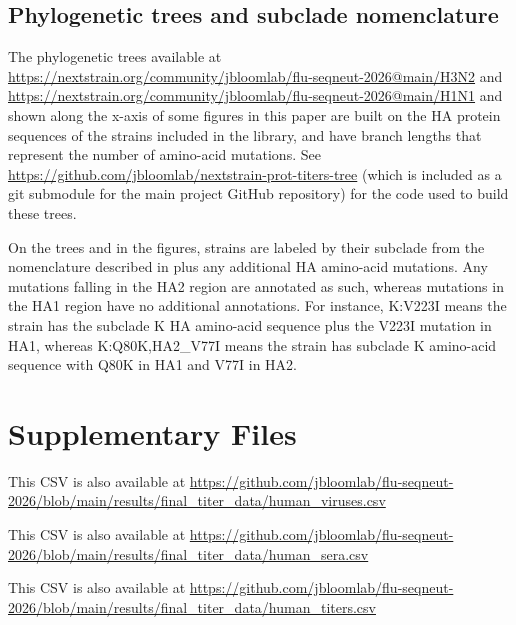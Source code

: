 \subsection{Phylogenetic trees and subclade nomenclature}

The phylogenetic trees available at \href{https://nextstrain.org/community/jbloomlab/flu-seqneut-2026@main/H3N2}{https://nextstrain.org/community/jbloomlab/flu-seqneut-2026@main/H3N2} and \href{https://nextstrain.org/community/jbloomlab/flu-seqneut-2026@main/H1N1}{https://nextstrain.org/community/jbloomlab/flu-seqneut-2026@main/H1N1} and shown along the x-axis of some figures in this paper are built on the HA protein sequences of the strains included in the library, and have branch lengths that represent the number of amino-acid mutations. See \href{https://github.com/jbloomlab/nextstrain-prot-titers-tree}{https://github.com/jbloomlab/nextstrain-prot-titers-tree} (which is included as a git submodule for the main project GitHub repository) for the code used to build these trees.

On the trees and in the figures, strains are labeled by their subclade from the nomenclature described in \citep{neher2026} plus any additional HA amino-acid mutations. Any mutations falling in the HA2 region are annotated as such, whereas mutations in the HA1 region have no additional annotations. For instance, K:V223I means the strain has the subclade K HA amino-acid sequence plus the V223I mutation in HA1, whereas K:Q80K,HA2\_V77I means the strain has subclade K amino-acid sequence with Q80K in HA1 and V77I in HA2.

\section{Supplementary Files}


This CSV is also available at \href{https://github.com/jbloomlab/flu-seqneut-2026/blob/main/results/final_titer_data/human_viruses.csv}{https://github.com/jbloomlab/flu-seqneut-2026/blob/main/results/final\_titer\_data/human\_viruses.csv}


This CSV is also available at \href{https://github.com/jbloomlab/flu-seqneut-2026/blob/main/results/final_titer_data/human_sera.csv}{https://github.com/jbloomlab/flu-seqneut-2026/blob/main/results/final\_titer\_data/human\_sera.csv}


This CSV is also available at \href{https://github.com/jbloomlab/flu-seqneut-2026/blob/main/results/final_titer_data/human_titers.csv}{https://github.com/jbloomlab/flu-seqneut-2026/blob/main/results/final\_titer\_data/human\_titers.csv}
